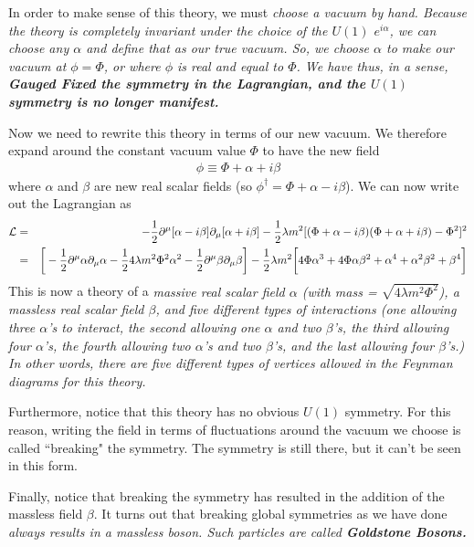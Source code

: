 \documentclass[12pt,epsf]{article}
\def\nolabel{\nonumber }
\def\nolabel{\nonumber }
\begin{document}
In order to make sense of this theory, we must \it choose \rm a vacuum
by hand.  Because the theory is completely invariant under the choice
of the $U(1)$ $e^{i\alpha}$, we can choose any $\alpha$ and \it define
\rm that as our true vacuum.  So, we choose $\alpha$ to make our vacuum
at $\phi = \Phi$, or where $\phi$ is real and equal to $\Phi$.	We have
thus, in a sense, \bf Gauged Fixed \rm the symmetry in the Lagrangian,
and the $U(1)$ symmetry is no longer manifest.	

Now we need to rewrite this theory in terms of our new vacuum.	We
therefore expand around the constant vacuum value $\Phi$ to have the
new field
\begin{eqnarray}
\phi \equiv \Phi + \alpha + i \beta\nolabel
\end{eqnarray}
where $\alpha$ and $\beta$ are new real scalar fields (so
$\phi^{\dagger} = \Phi + \alpha - i\beta$).  We can now write out the
Lagrangian as
\begin{eqnarray}
\mathcal{L} &=& -{1\over 2} \partial^{\mu}[ \alpha - i
\beta]\partial_{\mu}[\alpha + i \beta] - {1\over 2}\lambda m^2[(\Phi +
\alpha - i \beta)(\Phi + \alpha + i \beta) - \Phi^2]^2 \nolabel \\
&=& \bigg[-{1\over 2} \partial^{\mu}\alpha \partial_{\mu}\alpha -
{1\over 2} 4 \lambda m^2\Phi^2\alpha^2 - {1\over 2}\partial^{\mu}\beta
\partial_{\mu}\beta \bigg] - {1\over 2}\lambda m^2\bigg[4\Phi \alpha^3
+ 4\Phi \alpha \beta^2 + \alpha^4 + \alpha^2\beta^2 + \beta^4\bigg]
\nolabel \\ \label{eq:lowenergyeff}
\end{eqnarray}
This is now a theory of a \it massive \rm real scalar field
$\alpha$ (with mass = $\sqrt{4\lambda m^2\Phi^2}$), a
\it massless \rm real scalar field $\beta$, and five different
types of interactions (one allowing three $\alpha$'s to interact, the
second allowing one $\alpha$ and two $\beta$'s, the third allowing four
$\alpha$'s, the fourth allowing two $\alpha$'s and two $\beta$'s, and
the last allowing four $\beta$'s.)  In other words, there are five
different types of vertices allowed in the Feynman diagrams for this
theory.  

Furthermore, notice that this theory has no obvious $U(1)$ symmetry. 
For this reason, writing the field in terms of fluctuations around the
vacuum we choose is called ``breaking" the symmetry.  The symmetry is
still there, but it can't be seen in this form. 

Finally, notice that breaking the symmetry has resulted in the addition
of the massless field $\beta$.	It turns out that breaking global
symmetries as we have done \it always \rm results in a massless boson. 
Such particles are called \bf Goldstone Bosons\rm.  
\end{document}
